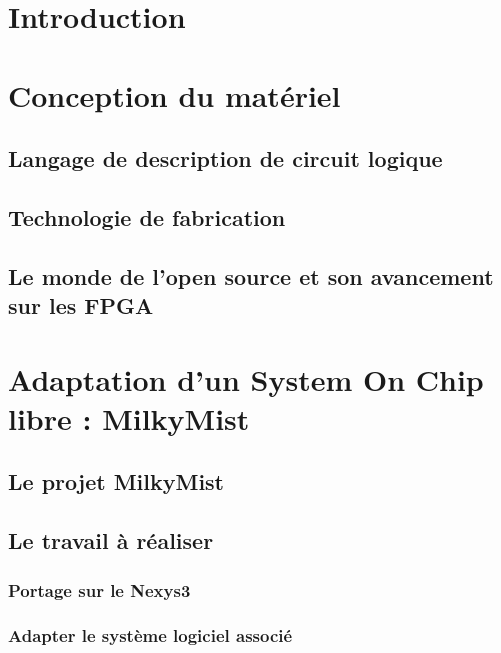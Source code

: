 \documentclass{report}
\begin{document}
\chapter*{Introduction} 


\chapter{Conception du matériel}

\section{Langage de description de circuit logique}  \newpage

\section{Technologie de fabrication} 

\section{Le monde de l'open source et son avancement sur les FPGA}
 \newpage

\chapter{Adaptation d'un System On Chip libre : MilkyMist} \newpage

\section{Le projet MilkyMist}  \newpage

\section{Le travail à réaliser}

\subsection{Portage sur le Nexys3}

 \newpage

\subsection{Adapter le système logiciel associé}

\newpage
\end{document}
